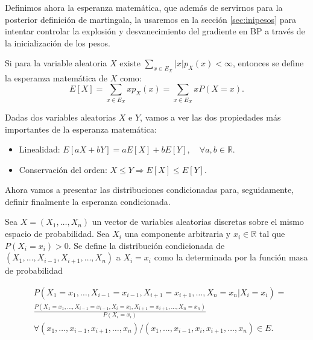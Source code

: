Definimos ahora la esperanza matemática, que además de servirnos para la posterior definición de martingala, la usaremos en la sección \ref{sec:inipesos} para intentar controlar la explosión y desvanecimiento del gradiente en BP a través de la inicialización de los pesos.

\begin{definicion}
	Si para la variable aleatoria $X$ existe $\sum_{x \in E_X} |x| p_X(x) < \infty$, entonces se define la esperanza matemática de $X$ como:
	\begin{equation*}
		E[X]= \sum_{x \in E_X} x p_X(x) = \sum_{x \in E_X} x P(X=x).
	\end{equation*}
\end{definicion}

Dadas dos variables aleatorias $X$ e $Y$, vamos a ver las dos propiedades más importantes de la esperanza matemática:

\begin{itemize}
	\item Linealidad: $E[aX+bY]=aE[X]+bE[Y], \quad \forall a,b \in \mathbb{R}$.

	\item Conservación del orden: $ X \leq Y \Rightarrow E[X] \leq E[Y]$.

\end{itemize}

Ahora vamos a presentar las distribuciones condicionadas para, seguidamente, definir finalmente la esperanza condicionada.

\begin{definicion}
	Sea $X=(X_1, \ldots, X_n)$ un vector de variables aleatorias discretas sobre el mismo espacio de probabilidad. Sea $X_i$ una componente arbitraria y $x_i \in \mathbb{R}$ tal que $P(X_i=x_i)>0$. Se define la distribución condicionada de $(X_1, \ldots, X_{i-1}, X_{i+1}, \ldots, X_n)$ a $X_i=x_i$ como la determinada por la función masa de probabilidad

\begin{align*}
	&P(X_1=x_1, \ldots, X_{i-1}=x_{i-1}, X_{i+1}=x_{i+1}, \ldots, X_n=x_n | X_i=x_i)= \\
	&\frac{P(X_1=x_1, \ldots, X_{i-1}=x_{i-1}, X_i=x_i,  X_{i+1}=x_{i+1}, \ldots, X_n=x_n )}{P(X_i=x_i)} \\
	& \forall (x_1, \ldots, x_{i-1}, x_{i+1}, \ldots, x_n) / (x_1, \ldots, x_{i-1}, x_i, x_{i+1}, \ldots, x_n) \in E.
\end{align*}
\end{definicion}

